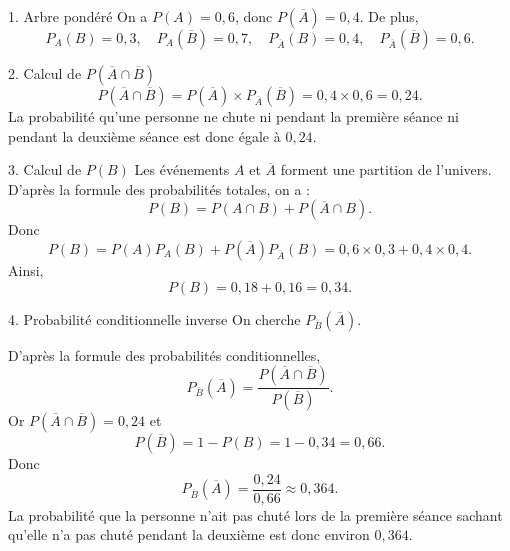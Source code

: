 \documentclass[11pt,a4paper]{article}
\begin{document}
\begin{correctionbox}{1. Arbre pondéré}
On a $P(A)=0{,}6$, donc $P(\overline A)=0{,}4$. De plus,
\[
P_A(B)=0{,}3,\quad P_A(\overline B)=0{,}7,
\quad P_{\overline A}(B)=0{,}4,
\quad P_{\overline A}(\overline B)=0{,}6.
\]

\begin{center}
\end{center}
\end{correctionbox}

\begin{correctionbox}{2. Calcul de $P(\overline A\cap\overline B)$}
\[
P(\overline A\cap\overline B)=P(\overline A)\times P_{\overline A}(\overline B)=0{,}4\times0{,}6=0{,}24.
\]
La probabilité qu'une personne ne chute ni pendant la première séance ni pendant la deuxième séance est donc égale à $0{,}24$.
\end{correctionbox}

\begin{correctionbox}{3. Calcul de $P(B)$}
Les événements $A$ et $\overline A$ forment une partition de l'univers. D'après la formule des probabilités totales, on a :
\[
P(B)=P(A\cap B)+P(\overline A\cap B).
\]
Donc
\[
P(B)=P(A)P_A(B)+P(\overline A)P_{\overline A}(B)=0{,}6\times0{,}3+0{,}4\times0{,}4.
\]
Ainsi,
\[
P(B)=0{,}18+0{,}16=0{,}34.
\]
\end{correctionbox}

\begin{correctionbox}{4. Probabilité conditionnelle inverse}
On cherche $P_{\overline B}(\overline A)$.

D'après la formule des probabilités conditionnelles,
\[
P_{\overline B}(\overline A)=\dfrac{P(\overline A\cap\overline B)}{P(\overline B)}.
\]
Or $P(\overline A\cap\overline B)=0{,}24$ et
\[
P(\overline B)=1-P(B)=1-0{,}34=0{,}66.
\]
Donc
\[
P_{\overline B}(\overline A)=\dfrac{0{,}24}{0{,}66}\approx0{,}364.
\]
La probabilité que la personne n'ait pas chuté lors de la première séance sachant qu'elle n'a pas chuté pendant la deuxième est donc environ $0{,}364$.
\end{correctionbox}
\end{document}
